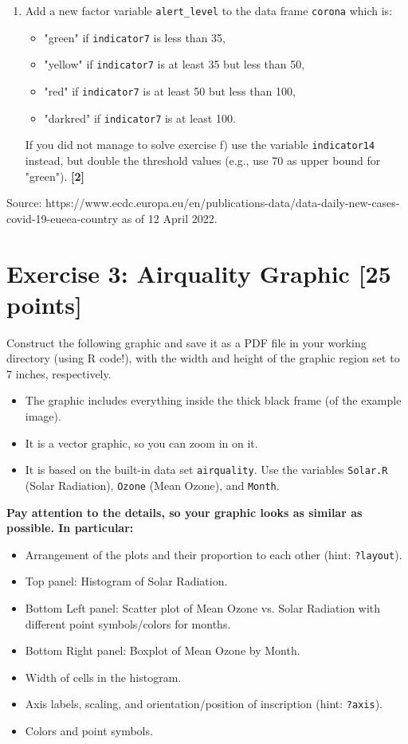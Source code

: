 \documentclass[a4paper,11pt]{article}
\begin{document}
\begin{enumerate}[label=\alph*)]
    \item Add a new factor variable \texttt{alert\_level} to the data frame \texttt{corona} which is:
    \begin{itemize}
        \item "green" if \texttt{indicator7} is less than 35,
        \item "yellow" if \texttt{indicator7} is at least 35 but less than 50,
        \item "red" if \texttt{indicator7} is at least 50 but less than 100,
        \item "darkred" if \texttt{indicator7} is at least 100.
    \end{itemize}
    If you did not manage to solve exercise f) use the variable \texttt{indicator14} instead, but double the threshold values (e.g., use 70 as upper bound for "green"). \textbf{[2]}
\end{enumerate}

\tiny{Source: https://www.ecdc.europa.eu/en/publications-data/data-daily-new-cases-covid-19-eueea-country as of 12 April 2022.}

\newpage

\section*{Exercise 3: Airquality Graphic [25 points]}

Construct the following graphic and save it as a PDF file in your working directory (using R code!), with the width and height of the graphic region set to 7 inches, respectively. 

\begin{itemize}
    \item The graphic includes everything inside the thick black frame (of the example image).
    \item It is a vector graphic, so you can zoom in on it.
    \item It is based on the built-in data set \texttt{airquality}. Use the variables \texttt{Solar.R} (Solar Radiation), \texttt{Ozone} (Mean Ozone), and \texttt{Month}.
\end{itemize}

\noindent \textbf{Pay attention to the details, so your graphic looks as similar as possible. In particular:}
\begin{itemize}
    \item Arrangement of the plots and their proportion to each other (hint: \texttt{?layout}).
    \item Top panel: Histogram of Solar Radiation.
    \item Bottom Left panel: Scatter plot of Mean Ozone vs. Solar Radiation with different point symbols/colors for months.
    \item Bottom Right panel: Boxplot of Mean Ozone by Month.
    \item Width of cells in the histogram.
    \item Axis labels, scaling, and orientation/position of inscription (hint: \texttt{?axis}).
    \item Colors and point symbols.
\end{itemize}
\end{document}
